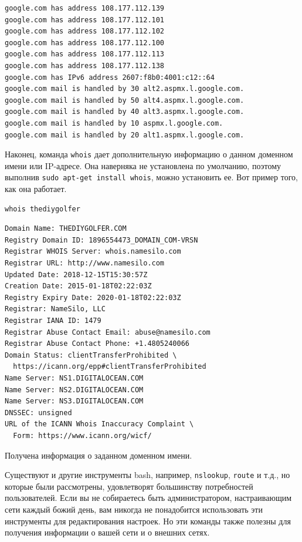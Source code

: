 \documentclass[12pt]{article}
\begin{document}
\begin{verbatim}
google.com has address 108.177.112.139
google.com has address 108.177.112.101
google.com has address 108.177.112.102
google.com has address 108.177.112.100
google.com has address 108.177.112.113
google.com has address 108.177.112.138
google.com has IPv6 address 2607:f8b0:4001:c12::64
google.com mail is handled by 30 alt2.aspmx.l.google.com.
google.com mail is handled by 50 alt4.aspmx.l.google.com.
google.com mail is handled by 40 alt3.aspmx.l.google.com.
google.com mail is handled by 10 aspmx.l.google.com.
google.com mail is handled by 20 alt1.aspmx.l.google.com.
\end{verbatim}

Наконец, команда \texttt{whois} дает дополнительную информацию о данном
доменном имени или IP-адресе. Она наверняка не установлена по умолчанию,
поэтому выполнив \texttt{sudo\ apt-get\ install\ whois}, можно
установить ее. Вот пример того, как она работает.

\begin{verbatim}
whois thediygolfer
\end{verbatim}

\begin{verbatim}
Domain Name: THEDIYGOLFER.COM
Registry Domain ID: 1896554473_DOMAIN_COM-VRSN
Registrar WHOIS Server: whois.namesilo.com
Registrar URL: http://www.namesilo.com
Updated Date: 2018-12-15T15:30:57Z
Creation Date: 2015-01-18T02:22:03Z
Registry Expiry Date: 2020-01-18T02:22:03Z
Registrar: NameSilo, LLC
Registrar IANA ID: 1479
Registrar Abuse Contact Email: abuse@namesilo.com
Registrar Abuse Contact Phone: +1.4805240066
Domain Status: clientTransferProhibited \
  https://icann.org/epp#clientTransferProhibited
Name Server: NS1.DIGITALOCEAN.COM
Name Server: NS2.DIGITALOCEAN.COM
Name Server: NS3.DIGITALOCEAN.COM
DNSSEC: unsigned
URL of the ICANN Whois Inaccuracy Complaint \
  Form: https://www.icann.org/wicf/
\end{verbatim}

Получена информация о заданном доменном имени.

Существуют и другие инструменты bash, например, \texttt{nslookup},
\texttt{route} и т.д., но которые были рассмотрены, удовлетворят
большинству потребностей пользователей. Если вы не собираетесь быть
администратором, настраивающим сети каждый божий день, вам никогда не
понадобится использовать эти инструменты для редактирования настроек. Но
эти команды также полезны для получения информации о вашей сети и о
внешних сетях.
\end{document}
